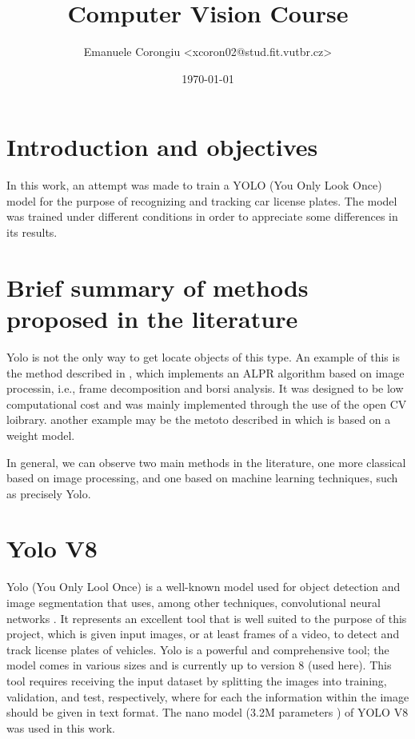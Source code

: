 \documentclass[12pt]{article}
\title{\textbf{Computer Vision Course}}
\author{Emanuele Corongiu <xcoron02@stud.fit.vutbr.cz>}
\date{\today}
\begin{document}


\section{Introduction and objectives}
In this work, an attempt was made to train a YOLO (You Only Look Once) model for the purpose of recognizing and tracking car license plates. The model was trained under different conditions in order to appreciate some differences in its results.



\section{Brief summary of methods proposed in the literature}
Yolo is not the only way to get locate objects of this type. An example of this is the method described in \cite{9790745}, which implements an ALPR algorithm based on image processin, i.e., frame decomposition and borsi analysis. It was designed to be low computational cost and was mainly implemented through the use of the open CV loibrary. another example may be the metoto described in \cite{9755690} which is based on a weight model.

In general, we can observe two main \cite{9755690} methods in the literature, one more classical based on image processing, and one based on machine learning techniques, such as precisely Yolo.
\clearpage

\section{Yolo V8}
Yolo (You Only Lool Once) \cite{yolo1} is a well-known model used for object detection and image segmentation that uses, among other techniques, convolutional neural networks \cite{CV_course_slide}. It represents an excellent tool that is well suited to the purpose of this project, which is given input images, or at least frames of a video, to detect and track license plates of vehicles. Yolo is a powerful and comprehensive tool; the model comes in various sizes and is currently up to version 8 (used here). This tool requires receiving the input dataset by splitting the images into training, validation, and test, respectively, where for each the information within the image should be given in text format. The nano model (3.2M parameters \cite{yolo1}) of YOLO V8 was used in this work.
\end{document}
